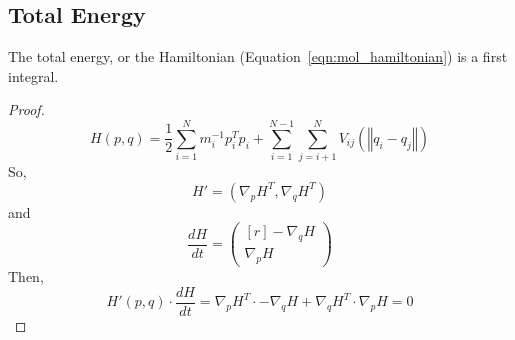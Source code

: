 \documentclass[../Main.tex]{subfiles}
\begin{document}
\subsection{Total Energy}

\begin{theorem} The total energy, or the Hamiltonian (Equation~\ref{eqn:mol_hamiltonian}) is a first integral. \end{theorem}
\begin{proof}
$$
H(p, q) = \frac{1}{2}\sum_{i = 1}^{N} m_{i}^{-1}p_{i}^{T}p_{i} + \sum_{i=1}^{N-1} \sum_{j=i+1}^{N} V_{ij}\left(\left\Vert q_{i} - q_{j} \right\Vert\right)
$$
So,
$$
	H' = \left(\nabla_{p}H^{T}, \nabla_{q}H^{T}\right)
$$
and
$$
	\frac{dH}{dt} =
		\begin{pmatrix*}[r]
			-\nabla_{q}H \\
			\nabla_{p}H
		\end{pmatrix*}
$$
Then, 
$$
H'(p, q) \cdot \frac{dH}{dt} = \nabla_{p}H^{T}\cdot-\nabla_{q}H + \nabla_{q}H^{T}\cdot \nabla_{p}H = 0
$$ 
\end{proof} 
\end{document}
